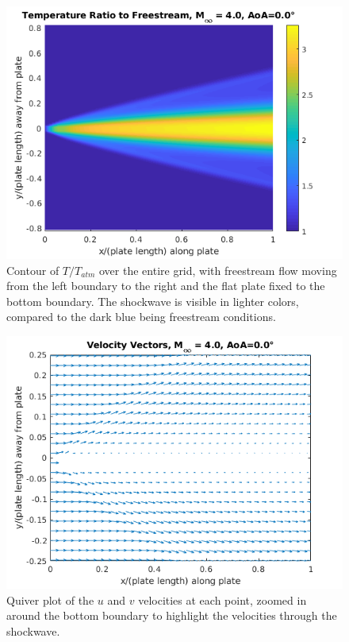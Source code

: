\documentclass[10pt,a4paper]{article}
\begin{document}
\begin{figure}[!htb]
	\begin{center}
		\includegraphics[scale=0.7]{images/TwoPlate_TempMap_0AoA.png} 
		\caption{Contour of $T/T_{atm}$ over the entire grid, with freestream flow moving from the left boundary to the right and the flat plate fixed to the bottom boundary. The shockwave is visible in lighter colors, compared to the dark blue being freestream conditions.}
		\label{fig:TwoPlate_TempMap_0AoA}
	\end{center}
\end{figure}

\begin{figure}[!htb]
	\begin{center}
		\includegraphics[scale=0.7]{images/TwoPlate_VelocityVectors_0AoA.png} 
		\caption{Quiver plot of the $u$ and $v$ velocities at each point, zoomed in around the bottom boundary to highlight the velocities through the shockwave.}
		\label{fig:TwoPlate_VelocityVectors_0AoA}
	\end{center}
\end{figure}
\end{document}
